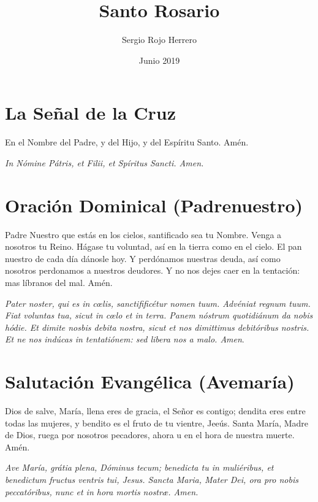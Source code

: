\documentclass[a4paper,11pt, oneside]{report}
\title{Santo Rosario}
\author{Sergio Rojo Herrero}
\date{Junio 2019}
\begin{document}
  
  \begin{titlepage}
    \maketitle    
  \end{titlepage}

  \newpage

  \section*{La Señal de la Cruz}
    En el Nombre del Padre, y del Hijo, y del Espíritu Santo. Amén.

    \medskip

    \textit{In Nómine Pátris, et Filii, et Spíritus Sancti. Amen.}

  \section*{Oración Dominical (Padrenuestro)}
    
    Padre Nuestro que estás en los cielos, santificado sea tu Nombre. Venga a nosotros tu Reino. Hágase tu voluntad, así en la tierra como
    en el cielo. El pan nuestro de cada día dánosle hoy. Y perdónamos nuestras deuda, así como nosotros perdonamos a nuestros deudores.
    Y no nos dejes caer en la tentación: mas líbranos del mal. Amén.
    
    \medskip

    \textit{Pater noster, qui es in c{\oe}lis, sanctifificétur nomen tuum. Advéniat regnum tuum. Fiat voluntas tua, sicut in c{\oe}lo et in terra.
    Panem nóstrum quotidiánum da nobis hódie. Et dimite nosbis debita nostra, sicut et nos dimittimus debitóribus nostris. Et ne nos indúcas
    in tentatiónem: sed libera nos a malo. Amen}.

  \section*{Salutación Evangélica (Avemaría)}
    Dios de salve, María, llena eres de gracia, el Señor es contigo; dendita eres entre todas las mujeres, y bendito es el fruto de tu
    vientre, Jeeús. Santa María, Madre de Dios, ruega por nosotros pecadores, ahora u en el hora de nuestra muerte. Amén.
    
    \medskip

    \textit{Ave María, grátia plena, Dóminus tecum; benedicta tu in muliéribus, et benedictum fructus ventris tui, Jesus.
    Sancta Maria, Mater Dei, ora pro nobis peccatóribus, nunc et in hora mortis nostr{\ae}. Amen.}
\end{document}
